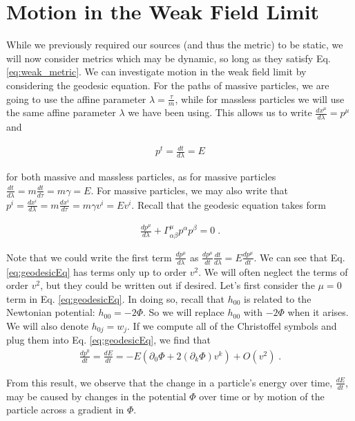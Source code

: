 \documentclass[10pt]{article}
\begin{document}
\section{Motion in the Weak Field Limit}
While we previously required our sources (and thus the metric) to be static, we will now consider metrics which may be dynamic, so long as they satisfy Eq. \ref{eq:weak_metric}. We can investigate motion in the weak field limit by considering the geodesic equation. For the paths of massive particles, we are going to use the affine parameter $\lambda = \frac{\tau}{m}$, while for massless particles we will use the same affine parameter $\lambda$ we have been using. This allows us to write $\frac{dx^\mu}{d\lambda}=p^\mu$ and

\begin{align}\label{eq:momentumRelation}
p^t = \frac{dt}{d\lambda} = E
\end{align}

\noindent for both massive and massless particles, as for massive particles $\frac{dt}{d\lambda}= m\frac{dt}{d\tau} = m\gamma = E$. For massive particles, we may also write that $p^i = \frac{dx^i}{d\lambda} = m\frac{dx^i}{d\tau} = m\gamma v^i = Ev^i$. Recall that the geodesic equation takes form

\begin{align}\label{eq:geodesicEq}
\frac{dp^\mu}{d\lambda} + \Gamma^\mu_{\alpha\beta} p^\alpha p^\beta = 0 \; .
\end{align}

\noindent Note that we could write the first term $\frac{dp^\mu}{d\lambda}$ as $\frac{dp^\mu}{dt}\frac{dt}{d\lambda} = E \frac{dp^\mu}{dt}$. We can see that Eq. \ref{eq:geodesicEq} has terms only up to order $v^2$. We will often neglect the terms of order $v^2$, but they could be written out if desired. Let's first consider the $\mu = 0$ term in Eq. \ref{eq:geodesicEq}. In doing so, recall that $h_{00}$ is related to the Newtonian potential: $h_{00} = -2\Phi$. So we will replace $h_{00}$ with $-2\Phi$ when it arises. We  will also denote $h_{0j} = w_j$. If we compute all of the Christoffel symbols and plug them into Eq. \ref{eq:geodesicEq}, we find that
\begin{align}\label{eq:dp0}
\frac{dp^0}{dt} = \frac{dE}{dt} = -E(\partial_0 \Phi + 2(\partial_k \Phi)v^k) + O(v^2) \; .
\end{align}

From this result, we observe that the change in a particle's energy over time, $\frac{dE}{dt}$, may be caused by changes in the potential $\Phi$ over time or by motion of the particle across a gradient in $\Phi$.
\end{document}
